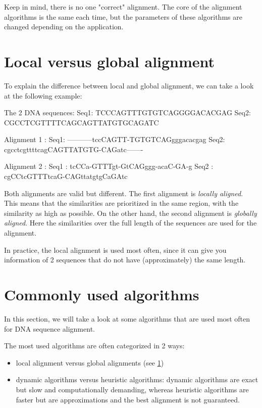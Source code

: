 Keep in mind, there is no one "correct" alignment. The core of the alignment algorithms is the same each time, but the parameters of these algorithms are changed depending on the application.

\section{Local versus global alignment}
\label{S:localVSglobalAlignment}

To explain the difference between local and global alignment, we can take a look at the following example:

\begin{lcverbatim}
	The 2 DNA sequences:
	Seq1: TCCCAGTTTGTGTCAGGGGACACGAG
	Seq2: CGCCTCGTTTTCAGCAGTTATGTGCAGATC
	
	Alignment 1 :
	Seq1: -----------tccCAGTT-TGTGTCAGgggacacgag
	Seq2: cgcctcgttttcagCAGTTATGTG-CAGatc-------
	
	Alignment 2 :
	Seq1 : tcCCa-GTTTgt-GtCAGggg-acaC-GA-g
	Seq2 : cgCCtcGTTTtcaG-CAGttatgtgCaGAtc
\end{lcverbatim}

Both alignments are valid but different. The first alignment is \emph{locally aligned}. This means that the similarities are prioritized in the same region, with the similarity as high as possible. On the other hand, the second alignment is \emph{globally aligned}. Here the similarities over the full length of the sequences are used for the alignment. 

In practice, the local alignment is used most often, since it can give you information of 2 sequences that do not have (approximately) the same length.

\section{Commonly used algorithms}

In this section, we will take a look at some algorithms that are used most often for DNA sequence alignment.


The most used algorithms are often categorized in 2 ways: 

\begin{itemize}
	\item local alignment versus global alignments (see \ref{S:localVSglobalAlignment})
	\item dynamic algorithms versus heuristic algorithms: dynamic algorithms are exact but slow and computationally demanding, whereas heuristic algorithms are faster but are approximations and the best alignment is not guaranteed.
\end{itemize}

